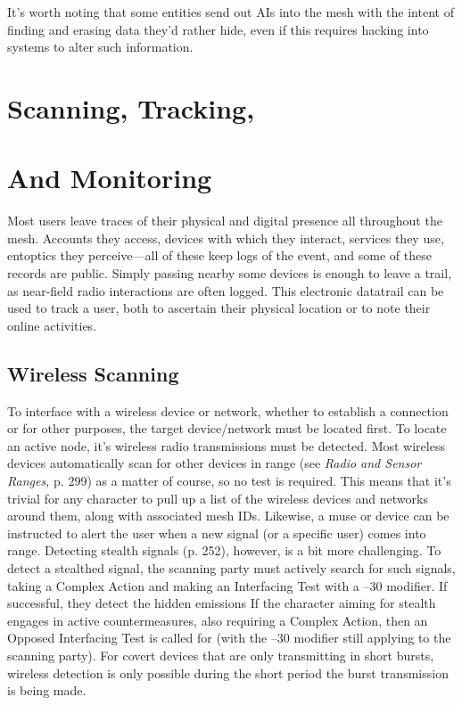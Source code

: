 It's worth noting that some entities send out AIs 
into the mesh with the intent of finding and erasing 
data they'd rather hide, even if this requires hacking 
into systems to alter such information.

\section{Scanning, Tracking, }


\section{And Monitoring}

Most users leave traces of their physical and digital 
presence all throughout the mesh. Accounts they access, 
devices with which they interact, services they use, entoptics
they perceive—all of these keep logs of the event,
and some of these records are public. Simply passing 
nearby some devices is enough to leave a trail, as near-field
radio interactions are often logged. This electronic
datatrail can be used to track a user, both to ascertain 
their physical location or to note their online activities.

\subsection{Wireless Scanning}

To interface with a wireless device or network, whether 
to establish a connection or for other purposes, the 
target device/network must be located first. To locate 
an active node, it's wireless radio transmissions must be 
detected. Most wireless devices automatically scan for 
other devices in range (see \textit{Radio and Sensor Ranges,} p. 
299) as a matter of course, so no test is required. This 
means that it's trivial for any character to pull up a 
list of the wireless devices and networks around them, 
along with associated mesh IDs. Likewise, a muse or 
device can be instructed to alert the user when a new 
signal (or a specific user) comes into range.
Detecting stealth signals (p. 252), however, is a bit 
more challenging. To detect a stealthed signal, the scanning
party must actively search for such signals, taking
a Complex Action and making an Interfacing Test with 
a –30 modifier. If successful, they detect the hidden emissions
If the character aiming for stealth engages in active
countermeasures, also requiring a Complex Action, then 
an Opposed Interfacing Test is called for (with the –30 
modifier still applying to the scanning party).
For covert devices that are only transmitting in 
short bursts, wireless detection is only possible during 
the short period the burst transmission is being made.

